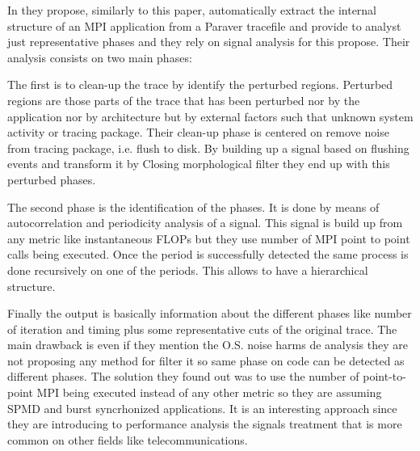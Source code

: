In \cite{casas2007automatic} they propose, similarly to this paper, 
automatically extract the internal structure of an MPI application from a
Paraver tracefile and provide to analyst just representative phases and they 
rely on signal analysis for this propose. 
Their analysis consists on two main phases:
\begin{enumerate*}[label=(\roman*)]
    \item The first is to clean-up the trace by identify the perturbed regions.
Perturbed regions are those parts of the trace that has been perturbed nor by
the application nor by architecture but by external factors such that unknown
system activity or tracing package. Their clean-up phase is centered on remove
noise from tracing package, i.e. flush to disk. By building up a signal based
on flushing events and transform it by Closing morphological filter they end up
with this perturbed phases. 
    \item The second phase is the identification of the
phases. It is done by means of autocorrelation and periodicity analysis of a
signal. This signal is build up from any metric like instantaneous FLOPs but
they use number of MPI point to point calls being executed. Once the period is
successfully detected the same process is done recursively on one of the
periods. This allows to have a hierarchical structure. 
\end{enumerate*}
Finally the output is
basically information about the different phases like number of iteration and
timing plus some representative cuts of the original trace. The main drawback is
even if they mention the O.S. noise harms de analysis they are not proposing any 
method for filter it so same phase on code can be detected as different phases.
The solution they found out was to use the number of point-to-point MPI being
executed instead of any other metric so they are assuming SPMD and burst
syncrhonized applications. It is an interesting approach since they
are introducing to performance analysis the signals treatment that is more
common on other fields like telecommunications.

